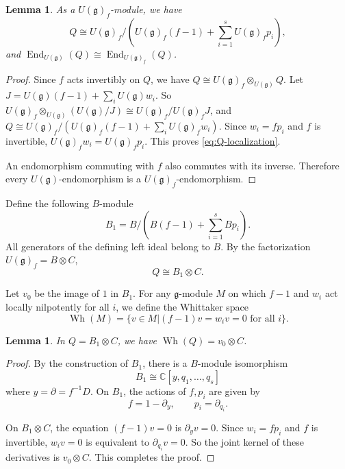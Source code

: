 \documentclass[12pt,a4paper]{amsart}
\numberwithin{equation}{section}
\newtheorem{lemma}[theorem]{Lemma}
\theoremstyle{definition}
\theoremstyle{remark}
\newcommand{\C}{\mathbb{C}}
\newcommand{\g}{\mathfrak g}
\newcommand{\End}{\operatorname{End}}
\newcommand{\Wh}{\operatorname{Wh}}
\newcommand{\Uf}{U(\g)_f}
\begin{document}
\begin{lemma}\label{lem:Q-localization}
As a $\Uf$-module,
we have
\begin{equation}\label{eq:Q-localization}
 Q\cong \Uf\big/
 (\Uf(f-1)+\sum_{i=1}^s \Uf p_i ),
\end{equation}
and $\End_{U(\g)}(Q)\cong \End_{\Uf}(Q)$.
\end{lemma}

\begin{proof}
Since $f$ acts invertibly on $Q$, we have $Q\cong \Uf\otimes_{U(\g)} Q$. Let $J=U(\g)(f-1)+\sum_i U(\g)w_i$.
So
$\Uf\otimes_{U(\g)}(U(\g)/J)\cong \Uf/\Uf J$,
and
\(Q\cong \Uf/(\Uf(f-1)+\sum_i \Uf w_i)\).
Since \(w_i=fp_i\) and \(f\) is invertible,
\(\Uf w_i=\Uf p_i\). This proves \eqref{eq:Q-localization}.

An endomorphism commuting with \(f\) also commutes with its inverse.
Therefore every \(U(\g)\)-endomorphism is a \(\Uf\)-endomorphism.
\end{proof}

Define the following $B$-module
\[
 B_1=B\big/(B(f-1)+\sum_{i=1}^s Bp_i).
\]
All generators of the defining left ideal belong to \(B\).
By the factorization \(\Uf=B\otimes C\),
\begin{equation}\label{eq:Q-factor}
 Q\cong B_1\otimes C.
\end{equation}

Let \(v_0\) be the image of \(1\) in $B_1$. For any \(\g\)-module \(M\) on which $f-1$ and $w_i$ act locally nilpotently for all $i$, we define the Whittaker space
\[
 \Wh(M)=\{v\in M| (f-1)v=w_iv=0\text{ for all }i\}.
\]

\begin{lemma}\label{lem:polynomial-model}
In \(Q=B_1\otimes C\),
we have
 $\Wh(Q)=v_0\otimes C$.
\end{lemma}

\begin{proof}

By the construction of $B_1$, there is a \(B\)-module isomorphism
\[
 B_1\cong\C[y,q_1,\ldots,q_s]
\]
where $y= \partial=f^{-1}D$. On $B_1$, the actions of
$f, p_i$ are given by
\begin{equation}\label{eq:polynomial-action}
 f=1-\partial_y,\qquad p_i=\partial_{q_i}.
\end{equation}

On \(B_1\otimes C\), the equation \((f-1)v=0\) is
\(\partial_yv=0\).
Since \(w_i=fp_i\) and \(f\) is invertible, \(w_iv=0\) is equivalent to
\(\partial_{q_i}v=0\).
So the joint kernel of these derivatives is \( v_0\otimes C\).
This completes the proof.
\end{proof}
\end{document}
